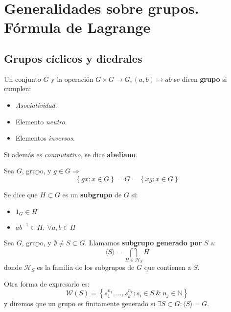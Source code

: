 \chapter{Generalidades sobre grupos.\\ Fórmula de Lagrange}
\section{Grupos cíclicos y diedrales}

\begin{defi}[Grupo]
Un conjunto $G$ y la operación $G \times G \rightarrow G, \left( a, b \right) \mapsto ab$ se dicen \textbf{grupo} si cumplen:
\begin{itemize}
    \item \textit{Asociatividad}.
    \item Elemento \textit{neutro}.
    \item Elementos \textit{inversos}.
\end{itemize}
Si además es \textit{conmutativo}, se dice \textbf{abeliano}.
\end{defi}

\begin{prop}
Sea $G$, grupo, y $g \in G \Rightarrow$
\[
\left\{ gx: x \in G \right\} = G = \left\{ xg : x \in G \right\}
\]
\end{prop}

\begin{defi}[Subgrupo]
Se dice que $H \subset G$ es un \textbf{subgrupo} de $G$ si:
\begin{itemize}
    \item $1_G \in H$
    \item $a b^{-1} \in H,\ \forall a, b \in H$
\end{itemize}
\end{defi}

\begin{defi}
Sea $G$, grupo, y $\emptyset \neq S \subset G$. Llamamos \textbf{subgrupo generado por} $S$ a:
\[
\langle S \rangle = \bigcap_{H \in \mathcal{H}_S} H
\]
donde $\mathcal{H}_S$ es la familia de los subgrupos de $G$ que contienen a $S$.

Otra forma de expresarlo es:
\[
    \mathcal{W}\left( S \right) = \left\{ s_1^{n_1}, \ldots, s_k^{n_k} : s_i \in S\ \&\ n_j \in \mathbb{N} \right\}
\]
y diremos que un grupo es finitamente generado si $\exists S \subset G: \langle S \rangle = G$.
\end{defi}

